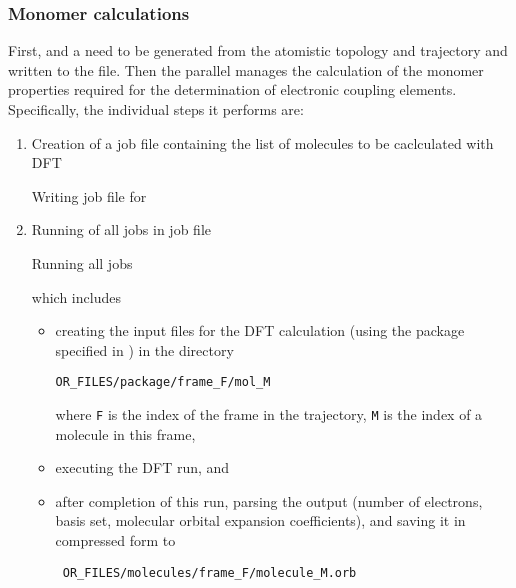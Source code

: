 \subsubsection{Monomer calculations}
\label{sec:edft}
First,  and a  need to be generated from the atomistic topology and trajectory and written to the \sqlstate file. Then the parallel  \calculator manages the calculation of the monomer properties required for the determination of electronic coupling elements. Specifically, the individual steps it performs are:
%
\begin{enumerate}
\item Creation of a job file containing the list of molecules to be caclculated with DFT 
\begin{bclogo}[couleur=bgblue, arrondi =0 , logo=\votcalogo, barre=line,noborder=true]{\small Writing job file for }
\itshape {\small \ctpparallel \opt \xmloptions \sql \sqlstate \exe {} \job \wrt }
\end{bclogo}
\item Running of all jobs in job file 
\begin{bclogo}[couleur=bgblue, arrondi =0 , logo=\votcalogo, barre=line,noborder=true]{\small Running all  jobs}
\itshape {\small \ctpparallel \opt \xmloptions \sql \sqlstate \exe {} \job \run }
\end{bclogo}
which includes
\begin{itemize}
\item creating the input files for the DFT calculation (using the package specified in \xmloptions) in the directory 
\begin{verbatim}
OR_FILES/package/frame_F/mol_M
\end{verbatim}
where {\tt F} is the index of the frame in the trajectory, {\tt M} is the index of a molecule in this frame,
\item executing the DFT run, and
\item after completion of this run, parsing the output (number of electrons, basis set, molecular orbital expansion coefficients), and saving it in compressed form to 
\begin{verbatim}
 OR_FILES/molecules/frame_F/molecule_M.orb 
\end{verbatim}
\end{itemize}
\end{enumerate}


